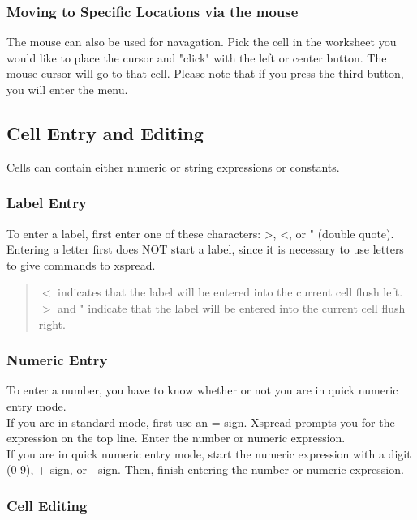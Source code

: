 \subsubsection*{Moving to Specific Locations via the mouse}

    The mouse can also be used for navagation.  Pick the cell in the worksheet you
would like to place the cursor and "click" with the left or center button.  The
mouse cursor will go to that cell.  Please note that if you press the third
button, you will enter the menu.

\subsection*{Cell Entry and Editing}

    Cells can contain either numeric or string expressions or constants.

\subsubsection*{Label Entry}

    To enter a label, first enter one of these characters: >, <, or " (double
quote).  Entering a letter first does NOT start a label, since it is necessary 
to use letters to give commands to xspread.
\begin{quote}
    $<$ indicates that the label will be entered into the current cell flush 
left.\\
    $>$ and " indicate that the label will be entered into the current cell 
flush right.
\end{quote}

\subsubsection*{Numeric Entry}

    To enter a number, you have to know whether or not you are in quick 
numeric entry mode.\\
    If you are in standard mode, first use an = sign.  Xspread prompts you for 
the expression on the top line.  Enter the number or numeric expression.\\
    If you are in quick numeric entry mode, start the numeric expression with 
a digit (0-9), + sign, or - sign.  Then, finish entering the number or numeric 
expression.

\subsubsection*{Cell Editing}

